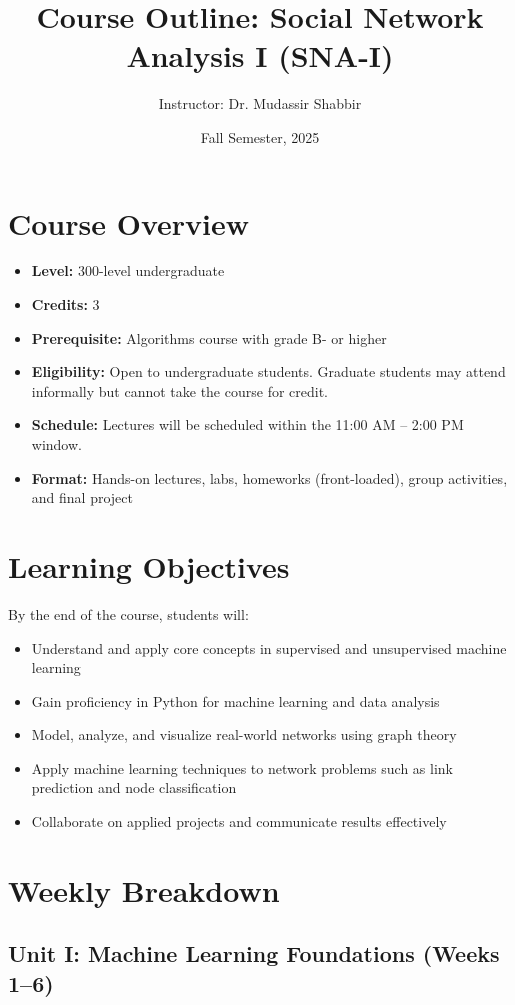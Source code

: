 \documentclass[12pt]{article}
\title{Course Outline: Social Network Analysis I (SNA-I)}
\author{Instructor: Dr. Mudassir Shabbir}
\date{Fall Semester, 2025}
\begin{document}
\maketitle

\section*{Course Overview}
\begin{itemize}[leftmargin=1.5em]
  \item \textbf{Level:} 300-level undergraduate
  \item \textbf{Credits:} 3
  \item \textbf{Prerequisite:} Algorithms course with grade B- or higher
  \item \textbf{Eligibility:} Open to undergraduate students. Graduate students may attend informally but cannot take the course for credit.
  \item \textbf{Schedule:} Lectures will be scheduled within the 11:00 AM -- 2:00 PM window.
  \item \textbf{Format:} Hands-on lectures, labs, homeworks (front-loaded), group activities, and final project
\end{itemize}

\section*{Learning Objectives}
By the end of the course, students will:
\begin{itemize}
  \item Understand and apply core concepts in supervised and unsupervised machine learning
  \item Gain proficiency in Python for machine learning and data analysis
  \item Model, analyze, and visualize real-world networks using graph theory
  \item Apply machine learning techniques to network problems such as link prediction and node classification
  \item Collaborate on applied projects and communicate results effectively
\end{itemize}

\section*{Weekly Breakdown}

\subsection*{Unit I: Machine Learning Foundations (Weeks 1--6)}
\end{document}
